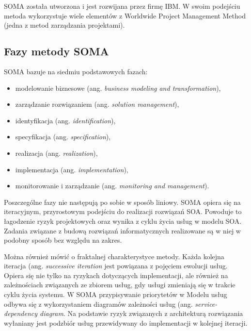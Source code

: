 SOMA została utworzona i jest rozwijana przez firmę IBM. W swoim podejściu metoda wykorzystuje wiele elementów z Worldwide Project Management Method (jedna z metod zarządzania projektami). \cite{SOMAArsIBMJour}

\subsection{Fazy metody SOMA}
SOMA bazuje na siedmiu podstawowych fazach:
\begin{itemize}
\item{modelowanie biznesowe (ang. \textit{business modeling and transformation}),}
\item{zarządzanie rozwiązaniem (ang. \textit{solution management}),}
\item{identyfikacja (ang. \textit{identification}),}
\item{specyfikacja (ang. \textit{specification}),}
\item{realizacja (ang. \textit{realization}),}
\item{implementacja (ang. \textit{implementation}),}
\item{monitorowanie i zarządzanie (ang. \textit{monitoring and management}).}
\end{itemize}

Poszczególne fazy nie następują po sobie w sposób liniowy. SOMA opiera się na iteracyjnym, przyrostowym podejściu do realizacji rozwiązań SOA. Powoduje to łagodzenie ryzyk projektowych oraz wynika z cyklu życia usług w modelu SOA. Zadania związane z budową rozwiązań informatycznych realizowane są w niej w podobny sposób bez względu na zakres. 

Można również mówić o fraktalnej charakterystyce metody. Każda kolejna  iteracja (ang. \textit{successive iteration} jest powiązana z pojęciem ewolucji usług. Opiera się nie tylko na ryzykach dotyczących implementacji, ale również na zależnościach związanych ze zbiorem usług, gdy usługi zmieniają się w trakcie cyklu życia systemu. W SOMA przypisywanie priorytetów w Modelu usług odbywa się z wykorzystaniem diagramów zależności usług (ang. \textit{service-dependency diagram}. Na podstawie ryzyk związanych z architekturą rozwiązania wyłaniany jest podzbiór usług przewidywany do implementacji w kolejnej iteracji.

